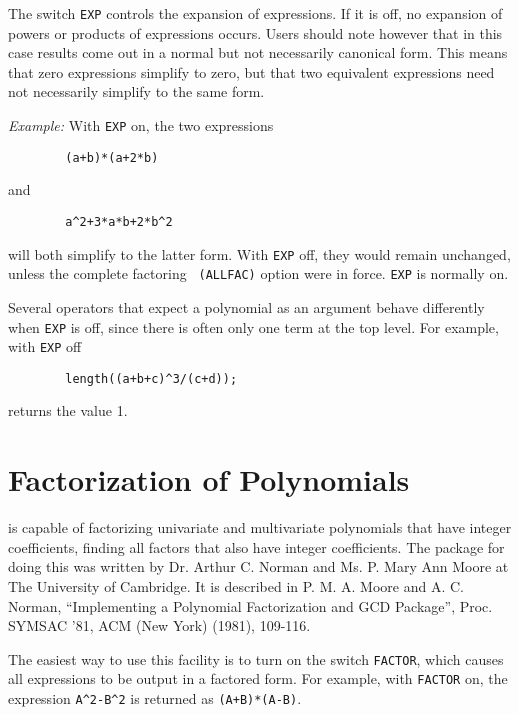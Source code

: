 The switch {\tt EXP} controls the expansion of expressions.  If
it is off, no expansion of powers or products of expressions occurs.
Users should note however that in this case results come out in a normal
but not necessarily canonical form.  This means that zero expressions
simplify to zero, but that two equivalent expressions need not necessarily
simplify to the same form.

{\it Example:} With {\tt EXP} on, the two expressions
\begin{verbatim}
        (a+b)*(a+2*b)
\end{verbatim}
and
\begin{verbatim}
        a^2+3*a*b+2*b^2
\end{verbatim}
will both simplify to the latter form.  With {\tt EXP}
off, they would remain unchanged, unless the complete factoring {\tt
(ALLFAC)} option were in force. {\tt EXP} is normally on.

Several operators that expect a polynomial as an argument behave
differently when {\tt EXP} is off, since there is often only one term at
the top level.  For example, with {\tt EXP} off
\begin{verbatim}
        length((a+b+c)^3/(c+d));
\end{verbatim}
returns the value 1.

\section{Factorization of Polynomials}
{\REDUCE} is capable of factorizing univariate and multivariate polynomials
that have integer coefficients, finding all factors that also have integer
coefficients. The package for doing this was written by Dr. Arthur C.
Norman and Ms. P. Mary Ann Moore at The University of Cambridge. It is
described in P. M. A. Moore and A. C. Norman, ``Implementing a Polynomial
Factorization and GCD Package'', Proc. SYMSAC '81, ACM (New York) (1981),
109-116.

The easiest way to use this facility is to turn on the switch
{\tt FACTOR}, which causes all expressions to be output in
a factored form.  For example, with {\tt FACTOR} on, the expression
{\tt A\verb|^|2-B\verb|^|2} is returned as {\tt (A+B)*(A-B)}.

